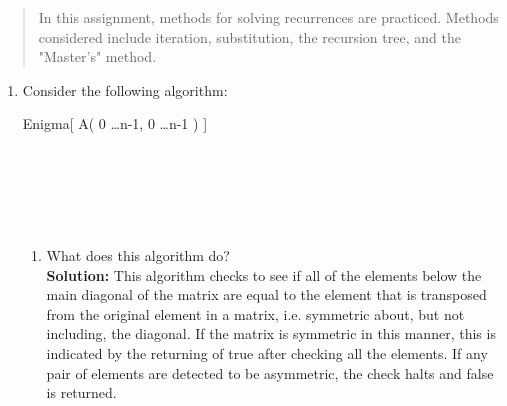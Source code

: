 \documentclass[11pts]{article}
\begin{document}
\maketitle

\begin{abstract}
In this assignment, methods for solving recurrences are practiced. Methods
considered include iteration, substitution, the recursion tree, and the
"Master's" method.
\end{abstract}
\newpage

\begin{enumerate}
\item Consider the following algorithm:
\begin{algorithm}{Enigma}[ A( 0 \dots n-1, 0 \dots n-1 ) ]{
   }
 \\
\do \\
   \\
  \do \\
     \\
      \qreturn \qfalse \qfi \qrof \qrof \\
\qreturn \qtrue
\end{algorithm}

  \begin{enumerate}
  \item What does this algorithm do? \\

  \textbf{Solution:} This algorithm checks to see if all of the elements
  below the main diagonal of the matrix are equal to the element that
  is transposed from the
  original element in a matrix, i.e. symmetric about, but not including,
  the diagonal. If the matrix is symmetric in this manner, this is indicated
  by the returning of true after checking all the elements. If any pair of
  elements are detected to be asymmetric, the check halts and false is
  returned. \\


\end{enumerate}
\end{enumerate}
\end{document}
